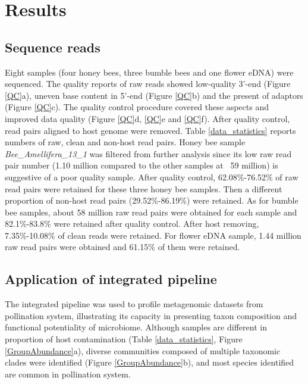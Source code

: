 \documentclass[11pt]{article}
\begin{document}
  \section{Results}

    \subsection{Sequence reads}
    Eight samples (four honey bees, three bumble bees and one flower eDNA) were sequenced. 
    The quality reports of raw reads showed low-quality 3'-end (Figure \ref{QC}a), uneven base content in 5'-end (Figure \ref{QC}b) and the present of adaptors (Figure \ref{QC}c). 
    The quality control procedure covered these aspects and improved data quality (Figure \ref{QC}d, \ref{QC}e and \ref{QC}f).
    \newline
    After quality control, read pairs aligned to host genome were removed. 
    Table \ref{data_statistics} reports numbers of raw, clean and non-host read pairs. 
    Honey bee sample \textit{Bee\_Amellifera\_13\_1} was filtered from further analysis since its low raw read pair number (1.10 million compared to the other samples at ~59 million) is suggestive of a poor quality sample.  
    After quality control, 62.08\%-76.52\% of raw read pairs were retained for these three honey bee samples. 
    Then a different proportion of non-host read pairs (29.52\%-86.19\%) were retained. 
    As for bumble bee samples, about 58 million raw read pairs were obtained for each sample and 82.1\%-83.8\% were retained after quality control. 
    After host removing, 7.35\%-10.08\% of clean reads were retained.  
    For flower eDNA sample, 1.44 million raw read pairs were obtained and 61.15\% of them were retained. 

    \subsection{Application of integrated pipeline}
    The integrated pipeline was used to profile metagenomic datasets from pollination system, illustrating its capacity in presenting taxon composition and functional potentiality of microbiome. 
    Although samples are different in proportion of host contamination (Table \ref{data_statistics}, Figure \ref{GroupAbundance}a), diverse communities composed of multiple taxonomic clades were identified (Figure \ref{GroupAbundance}b), and most species identified are common in pollination system. 
\end{document}
